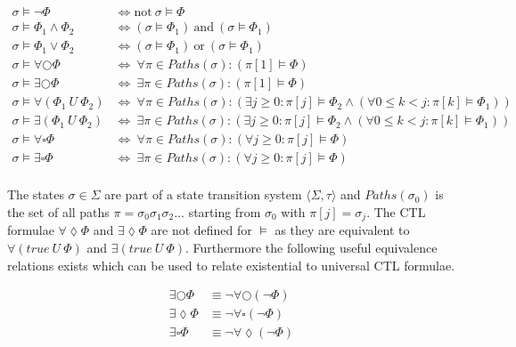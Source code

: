 \documentclass[11pt,a4paper,titlepage]{article}
\theoremstyle{definition}
\begin{document}
\begin{align*}
    \sigma \models \neg \Phi  &\iff \text{not} \ \sigma \models \Phi \\ 
    \sigma \models \Phi_1 \land \Phi_2   &\iff (\sigma \models \Phi_1) \ \text{and} \ (\sigma \models \Phi_1) \\ 
    \sigma \models \Phi_1 \lor \Phi_2   &\iff (\sigma \models \Phi_1) \ \text{or} \ (\sigma \models \Phi_1) \\ 
    \sigma \models \forall\bigcirc\Phi &\iff \ \forall \pi \in Paths(\sigma) \colon (\pi [1] \models \Phi) \\ 
    \sigma \models \exists\bigcirc\Phi &\iff \ \exists \pi \in Paths(\sigma) \colon (\pi [1] \models \Phi) \\ 
    \sigma \models \forall(\Phi_1 \ U \ \Phi_2) &\iff \ \forall \pi \in Paths(\sigma) \colon 
    (\exists j \geq 0 \colon \pi[j] \models \Phi_2 \land (\forall 0 \leq k < j \colon \pi[k] \models \Phi_1)) \\ 
    \sigma \models \exists(\Phi_1 \ U \ \Phi_2) &\iff \ \exists \pi \in Paths(\sigma) \colon 
    (\exists j \geq 0 \colon \pi[j] \models \Phi_2 \land (\forall 0 \leq k < j \colon \pi[k] \models \Phi_1)) \\ 
    \sigma \models \forall\square\Phi &\iff \ \forall \pi \in Paths(\sigma) \colon (\forall j \geq 0 \colon \pi[j] \models \Phi) \\ 
    \sigma \models \exists\square\Phi &\iff \ \exists \pi \in Paths(\sigma) \colon (\forall j \geq 0 \colon \pi[j] \models \Phi) \\ 
\end{align*}

The states $\sigma \in \Sigma$ are part of a state transition system $\langle \Sigma, \tau \rangle$ and 
$Paths(\sigma_0)$ is the set of all paths $\pi = \sigma_0 \sigma_1 \sigma_2 \dots$ starting from $\sigma_0$ with $\pi[j] = \sigma_j$.
The CTL formulae $\forall\lozenge\Phi$ and $\exists\lozenge\Phi$ are not defined for $\models$ as they are equivalent to 
$\forall(true \ U \ \Phi)$ and $\exists(true \ U \ \Phi)$. Furthermore the following useful equivalence relations 
exists which can be used to relate existential to universal CTL formulae.

\begin{align*}
    \exists\bigcirc\Phi &\equiv \neg \forall\bigcirc(\neg \Phi)\\ 
    \exists\lozenge\Phi &\equiv \neg \forall\square(\neg \Phi) \\
    \exists\square\Phi  &\equiv \neg \forall\lozenge(\neg \Phi) \\
\end{align*}
\end{document}
